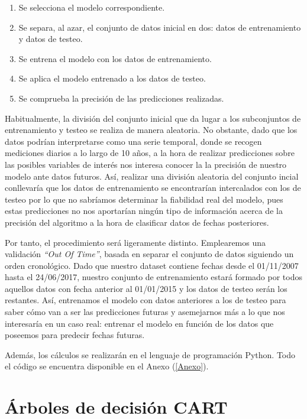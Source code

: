 \documentclass[12pt,twoside]{article}
\begin{document}
\begin{enumerate}
\item Se selecciona el modelo correspondiente.
\item Se separa, al azar, el conjunto de datos inicial en dos: datos de entrenamiento y datos de testeo.
\item Se entrena el modelo con los datos de entrenamiento.
\item Se aplica el modelo entrenado a los datos de testeo.
\item Se comprueba la precisión de las predicciones realizadas.
\end{enumerate}

Habitualmente, la división del conjunto inicial que da lugar a los subconjuntos de entrenamiento y testeo se realiza de manera aleatoria. No obstante, dado que los datos podrían interpretarse como una serie temporal, donde se recogen mediciones diarios a lo largo de 10 años, a la hora de realizar predicciones sobre las posibles variables de interés nos interesa conocer la la precisión de nuestro modelo ante datos futuros.  Así, realizar una división aleatoria del conjunto incial conllevaría que los datos de entrenamiento se encontrarían intercalados con los de testeo por lo que no sabríamos determinar la fiabilidad real del modelo, pues estas predicciones no nos aportarían ningún tipo de información acerca de la precisión del algoritmo a la hora de clasificar datos de fechas posteriores.

Por tanto, el procedimiento será ligeramente distinto. Emplearemos una validación \textit{``Out Of Time''}, basada en separar el conjunto de datos siguiendo un orden cronológico. Dado que nuestro dataset contiene fechas desde el 01/11/2007 hasta el 24/06/2017, nuestro conjunto de entrenamiento estará formado por todos aquellos datos con fecha anterior al 01/01/2015 y los datos de testeo serán los restantes. Así, entrenamos el modelo con datos anteriores a los de testeo para saber cómo van a ser las predicciones futuras y asemejarnos más a lo que nos interesaría en un caso real: entrenar el modelo en función de los datos que poseemos para predecir fechas futuras.

Además, los cálculos se realizarán en el lenguaje de programación Python. Todo el código se encuentra disponible en el Anexo (\ref{Anexo}).



\newpage



\section{Árboles de decisión CART}
\end{document}
